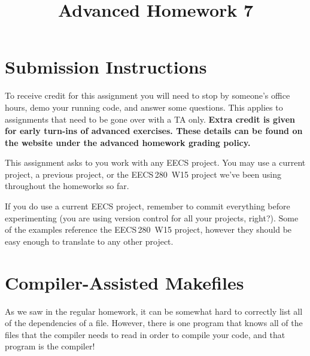 \documentclass{article}
\begin{document}
\fancyfoot[C]{\color{gray} \thepage~/~\pageref*{LastPage}}
\pagestyle{fancyplain}

\title{\textbf{Advanced Homework 7\\}}
\author{\textbf{\color{red}{Due: Wednesday, February 28th, 11:59PM (Hard Deadline)}}}
\date{}
\maketitle


\section*{Submission Instructions}
To receive credit for this assignment you will need to stop by someone's
office hours, demo your running code, and answer some questions. \textbf{\color{red}{Make sure
to check the office hour schedule as the real due date is at the last office
hours before the date listed above.}} This applies to assignments that need to be gone over with a TA only.
\textbf{Extra credit is given for early turn-ins of advanced exercises. These details can be found on the website under the advanced homework grading policy.}


\begin{mdframed}[innerleftmargin=38pt,innerrightmargin=38pt]\justify
  This assignment asks to you work with any EECS project. You may use a
  current project, a previous project, or the EECS\,280~W15 project we've been
  using throughout the homeworks so far.

  If you do use a current EECS project, remember to commit everything before
  experimenting (you are using version control for all your projects, right?).
  Some of the examples reference the EECS\,280~W15 project, however they should
  be easy enough to translate to any other project.
\end{mdframed}

\section{Compiler-Assisted Makefiles}

As we saw in the regular homework, it can be somewhat hard to correctly list
all of the dependencies of a file. However, there is one program that knows
all of the files that the compiler needs to read in order to compile your
code, and that program is the compiler!
\end{document}
